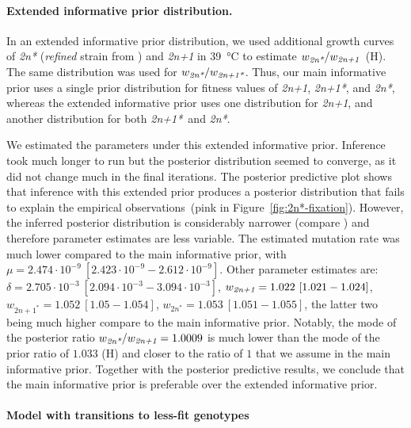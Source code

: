 \documentclass[12pt]{extarticle}
\newcommand{\anwt}{\emph{2n+1}}
\newcommand{\eumt}{\emph{2n*}}
\newcommand{\anmt}{\emph{2n+1*}}
\begin{document}
\paragraph{Extended informative prior distribution.}
In an extended informative prior distribution, we used additional growth curves of \eumt\; (\emph{refined} strain from \citet{Yona2012}) and \anwt\; in \SI{39}{\celsius} to estimate $w_{\eumt}/w_{\anwt}$~(H). The same distribution was used for $w_{\eumt}/w_{\anmt}$. 
Thus, our main informative prior uses a single prior distribution for fitness values of \anwt, \anmt, and \eumt, whereas the extended informative prior uses one distribution for \anwt, and another distribution for both \anmt\ and \eumt. 

We estimated the parameters under this extended informative prior.
Inference took much longer to run but the posterior distribution seemed to converge, as it did not change much in the final iterations. 
The posterior predictive plot shows that inference with this extended prior produces a posterior distribution that fails to explain the empirical observations~(pink in Figure~\ref{fig:2n*-fixation}).
However, the inferred posterior distribution is considerably narrower (compare ) and therefore parameter estimates are less variable.
The estimated mutation rate was much lower compared to the main informative prior, 
with $\mu=2.474\cdot10^{-9}\ [2.423\cdot10^{-9}-2.612\cdot10^{-9}]$. Other parameter estimates are: $\delta=2.705\cdot10^{-3}\ [2.094\cdot10^{-3}-3.094\cdot10^{-3}]$,
$w_{\anwt}=1.022\ [1.021-1.024]$,
$w_{2n+1^*}=1.052\ [1.05-1.054]$,
$w_{2n^*}=1.053\ [1.051-1.055]$, the latter two being much higher compare to the main informative prior. 
Notably, the mode of the posterior ratio $w_{\eumt}/w_{\anwt}=1.0009$ is much lower than the mode of the prior ratio of $1.033$ (H) and closer to the ratio of $1$ that we assume in the main informative prior.
Together with the posterior predictive results, we conclude that the main informative prior is preferable over the extended informative prior.


\paragraph{Model with transitions to less-fit genotypes}
\end{document}
